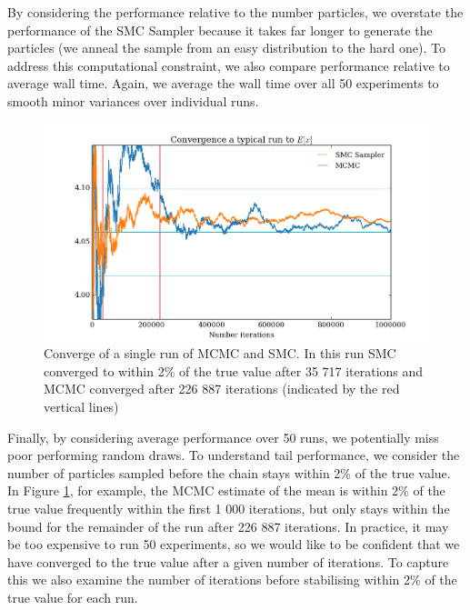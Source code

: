 \documentclass[12pt]{elsarticle}
\begin{document}
By considering the performance relative to the number particles, we overstate the performance of the SMC Sampler because it takes far longer to generate the particles (we anneal the sample from an easy distribution to the hard one). To address this computational constraint, we also compare performance relative to average wall time. Again, we average the wall time over all 50 experiments to smooth minor variances over individual runs. \\


\begin{figure}[htbp]
\begin{center}
\includegraphics[width = \textwidth]{plots/Convergence.png}
\caption{Converge of a single run of MCMC and SMC. In this run SMC converged to within 2\% of the true value after 35 717 iterations and MCMC converged after 226 887 iterations (indicated by the red vertical lines)}
\label{convergence}
\end{center}
\end{figure}

Finally, by considering average performance over 50 runs, we potentially miss poor performing random draws. To understand tail performance, we consider the number of particles sampled before the chain stays within 2\% of the true value. In Figure  \ref{convergence}, for example, the MCMC estimate of the mean is within 2\% of the true value frequently within the first 1 000 iterations, but only stays within the bound for the remainder of the run after 226 887 iterations. In practice, it may be too expensive to run 50 experiments, so we would like to be confident that we have converged to the true value after a given number of iterations. To capture this we also examine the number of iterations before stabilising within 2\% of the true value for each run.
\end{document}
